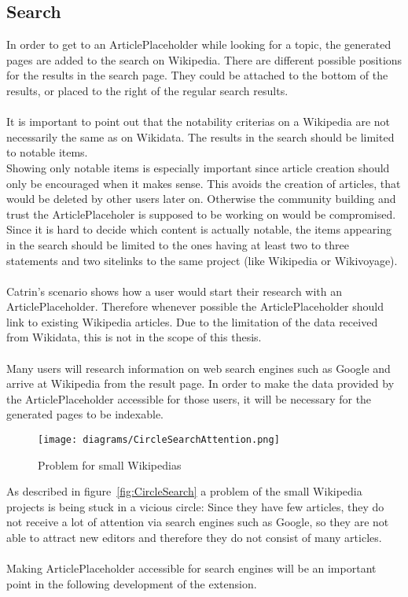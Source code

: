 \subsection{Search}
In order to get to an ArticlePlaceholder while looking for a topic, the generated pages are added to the search on Wikipedia. There are different possible positions for the results in the search page. They could be attached to the bottom of the results, or placed to the right of the regular search results. \\
\\
It is important to point out that the notability criterias on a Wikipedia are not necessarily the same as on Wikidata. The results in the search should be limited to notable items. \\
Showing only notable items is especially important since article creation should only be encouraged when it makes sense. This avoids the creation of articles, that would be deleted by other users later on. Otherwise the community building and trust the ArticlePlaceholer is supposed to be working on would be compromised. \\
Since it is hard to decide which content is actually notable, the items appearing in the search should be limited to the ones having at least two to three statements and two sitelinks to the same project (like Wikipedia or Wikivoyage). \\
\\
Catrin's scenario shows how a user would start their research with an ArticlePlaceholder. Therefore whenever possible the ArticlePlaceholder should link to existing Wikipedia articles. Due to the limitation of the data received from Wikidata, this is not in the scope of this thesis. \\
\\
Many users will research information on web search engines such as Google and arrive at Wikipedia from the result page. In order to make the data provided by the ArticlePlaceholder accessible for those users, it will be necessary for the generated pages to be indexable.
\begin{figure}[H]\label{fig:CircleSearch}
	\centering
	\texttt{[image: diagrams/CircleSearchAttention.png]}
	\caption{Problem for small Wikipedias}
	\label{diagramCircleSearch}
\end{figure}
As described in figure~\ref{fig:CircleSearch} a problem of the small Wikipedia projects is being stuck in a vicious circle: Since they have few articles, they do not receive a lot of attention via search engines such as Google, so they are not able to attract new editors and therefore they do not consist of many articles. \\
\\
Making ArticlePlaceholder accessible for search engines will be an important point in the following development of the extension. 

